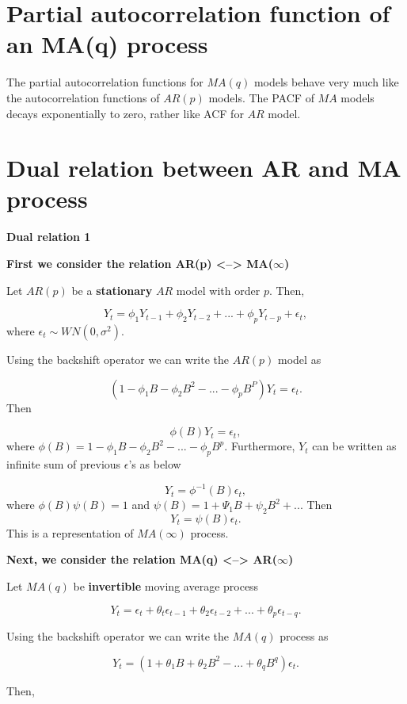 \documentclass[
  11pt,
  a4paper,
]{report}
\begin{document}
\section{Partial autocorrelation function of an MA(q)
process}\label{partial-autocorrelation-function-of-an-maq-process}

The partial autocorrelation functions for \(MA(q)\) models behave very
much like the autocorrelation functions of \(AR(p)\) models. The PACF of
\(MA\) models decays exponentially to zero, rather like ACF for \(AR\)
model.

\section{Dual relation between AR and MA
process}\label{dual-relation-between-ar-and-ma-process}

\textbf{Dual relation 1}

\textbf{First we consider the relation AR(p) \textless--\textgreater{}
MA(}\(\infty\)\textbf{)}

Let \(AR(p)\) be a \textbf{stationary} \(AR\) model with order \(p\).
Then,

\[Y_t = \phi_1Y_{t-1}+ \phi_2Y_{t-2}+...+ \phi_pY_{t-p}+\epsilon_t,\]
where \(\epsilon_t \sim WN(0, \sigma^2).\)

Using the backshift operator we can write the \(AR(p)\) model as

\[(1-\phi_1B-\phi_2B^2-...-\phi_pB^P)Y_t=\epsilon_t.\] Then

\[\phi(B)Y_t=\epsilon_t,\] where
\(\phi(B)=1-\phi_1B-\phi_2B^2-...-\phi_pB^p.\) Furthermore, \(Y_t\) can
be written as infinite sum of previous \(\epsilon\)'s as below

\[Y_t = \phi^{-1}(B)\epsilon_t,\] where \(\phi(B)\psi(B)=1\) and
\(\psi(B)=1+\Psi_1B+\psi_2B^2+...\) Then \[Y_t=\psi(B)\epsilon_t.\] This
is a representation of \(MA(\infty)\) process.

\textbf{Next, we consider the relation MA(q) \textless--\textgreater{}
AR(}\(\infty\)\textbf{)}

Let \(MA(q)\) be \textbf{invertible} moving average process

\[Y_t = \epsilon_t + \theta_t\epsilon_{t-1}+\theta_2\epsilon_{t-2}+...+\theta_p\epsilon_{t-q}.\]

Using the backshift operator we can write the \(MA(q)\) process as

\[Y_t = (1+\theta_1B+\theta_2B^2-...+\theta_qB^q)\epsilon_t.\]

Then,
\end{document}
